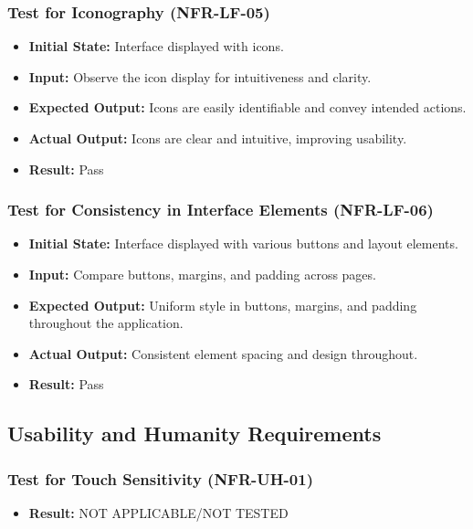 \documentclass[12pt, titlepage]{article}
\begin{document}
\subsubsection{Test for Iconography (NFR-LF-05)}
\begin{itemize}
    \item \textbf{Initial State: }Interface displayed with icons.
    \item \textbf{Input: }Observe the icon display for intuitiveness and clarity.
    \item \textbf{Expected Output: }Icons are easily identifiable and convey intended actions.
    \item \textbf{Actual Output: }Icons are clear and intuitive, improving usability.
    \item \textbf{Result: }Pass
\end{itemize}

\subsubsection{Test for Consistency in Interface Elements (NFR-LF-06)}
\begin{itemize}
    \item \textbf{Initial State: }Interface displayed with various buttons and layout elements.
    \item \textbf{Input: }Compare buttons, margins, and padding across pages.
    \item \textbf{Expected Output: }Uniform style in buttons, margins, and padding throughout the application.
    \item \textbf{Actual Output: }Consistent element spacing and design throughout.
    \item \textbf{Result: }Pass
\end{itemize}

\subsection{Usability and Humanity Requirements}

\subsubsection{Test for Touch Sensitivity (NFR-UH-01)}
\begin{itemize}
    \item \textbf{Result: }NOT APPLICABLE/NOT TESTED
\end{itemize}
\end{document}
